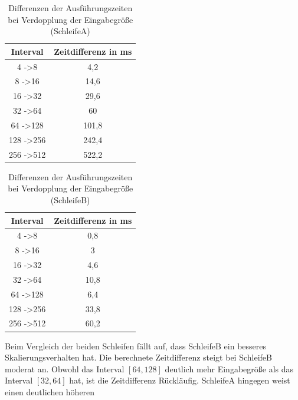     \begin{table}[H]
        \centering
        \begin{tabular}{|c|c|}
            \hline
            \textbf{Interval}     & \textbf{Zeitdifferenz in ms} \\ \hline
            4 -\textgreater 8     & 4,2                          \\ \hline
            8 -\textgreater 16    & 14,6                         \\ \hline
            16 -\textgreater 32   & 29,6                         \\ \hline
            32 -\textgreater 64   & 60                           \\ \hline
            64 -\textgreater 128  & 101,8                        \\ \hline
            128 -\textgreater 256 & 242,4                        \\ \hline
            256 -\textgreater 512 & 522,2                        \\ \hline
        \end{tabular}
        \caption{Differenzen der Ausführungszeiten bei Verdopplung der Eingabegröße (SchleifeA)}
        \label{tab:zeitdifferenz-schleifea}    
    \end{table}
    \begin{table}[H]
        \centering
        \begin{tabular}{|c|c|}
            \hline
            \textbf{Interval}     & \textbf{Zeitdifferenz in ms} \\ \hline
            4 -\textgreater 8     & 0,8                          \\ \hline
            8 -\textgreater 16    & 3                            \\ \hline
            16 -\textgreater 32   & 4,6                          \\ \hline
            32 -\textgreater 64   & 10,8                         \\ \hline
            64 -\textgreater 128  & 6,4                          \\ \hline
            128 -\textgreater 256 & 33,8                         \\ \hline
            256 -\textgreater 512 & 60,2                         \\ \hline
        \end{tabular}
        \caption{Differenzen der Ausführungszeiten bei Verdopplung der Eingabegröße (SchleifeB)}
        \label{tab:zeitdifferenz-schleifeb}    
    \end{table}
    Beim Vergleich der beiden Schleifen fällt auf, dass SchleifeB ein besseres Skalierungsverhalten hat.
    Die berechnete Zeitdifferenz steigt bei SchleifeB moderat an.
    Obwohl das Interval $[64, 128]$ deutlich mehr Eingabegröße als das Interval $[32, 64]$ hat, ist die Zeitdifferenz Rückläufig.
    SchleifeA hingegen weist einen deutlichen höheren
    

